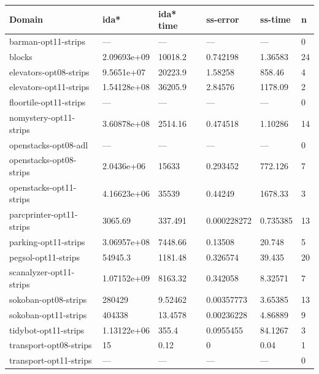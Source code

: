 \documentclass[11pt,a4paper,oneside]{report}
\begin{document}
\begin{longtable}{@{\extracolsep{\fill}} llllll @{}}
Domain                   & ida*        & ida* time & ss-error    & ss-time  & n  \\ \hline
barman-opt11-strips      & ---         & ---       & ---         & ---      & 0  \\ \hline
blocks                   & 2.09693e+09 & 10018.2   & 0.742198    & 1.36583  & 24 \\ \hline
elevators-opt08-strips   & 9.5651e+07  & 20223.9   & 1.58258     & 858.46   & 4  \\ \hline
elevators-opt11-strips   & 1.54128e+08 & 36205.9   & 2.84576     & 1178.09  & 2  \\ \hline
floortile-opt11-strips   & ---         & ---       & ---         & ---      & 0  \\ \hline
nomystery-opt11-strips   & 3.60878e+08 & 2514.16   & 0.474518    & 1.10286  & 14 \\ \hline
openstacks-opt08-adl     & ---         & ---       & ---         & ---      & 0  \\ \hline
openstacks-opt08-strips  & 2.0436e+06  & 15633     & 0.293452    & 772.126  & 7  \\ \hline
openstacks-opt11-strips  & 4.16623e+06 & 35539     & 0.44249     & 1678.33  & 3  \\ \hline
parcprinter-opt11-strips & 3065.69     & 337.491   & 0.000228272 & 0.735385 & 13 \\ \hline
parking-opt11-strips     & 3.06957e+08 & 7448.66   & 0.13508     & 20.748   & 5  \\ \hline
pegsol-opt11-strips      & 54945.3     & 1181.48   & 0.326574    & 39.435   & 20 \\ \hline
scanalyzer-opt11-strips  & 1.07152e+09 & 8163.32   & 0.342058    & 8.32571  & 7  \\ \hline
sokoban-opt08-strips     & 280429      & 9.52462   & 0.00357773  & 3.65385  & 13 \\ \hline
sokoban-opt11-strips     & 404338      & 13.4578   & 0.00236228  & 4.86889  & 9  \\ \hline
tidybot-opt11-strips     & 1.13122e+06 & 355.4     & 0.0955455   & 84.1267  & 3  \\ \hline
transport-opt08-strips   & 15          & 0.12      & 0           & 0.04     & 1  \\ \hline
transport-opt11-strips   & ---         & ---       & ---         & ---      & 0  \\ \hline

\end{longtable}
\end{document}
